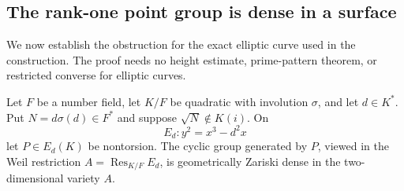 \subsection{The rank-one point group is dense in a surface}

We now establish the obstruction for the exact elliptic curve
used in the construction.  The proof needs no height estimate,
prime-pattern theorem, or restricted converse for elliptic curves.

\begin{lemma}\label{lem:conjugate-twist-density}
Let $F$ be a number field, let $K/F$ be quadratic with involution
$\sigma$, and let $d\in K^*$.  Put $N=d\sigma(d)\in F^*$ and
suppose $\sqrt N\notin K(i)$.  On
\[
                         E_d:y^2=x^3-d^2x
\]
let $P\in E_d(K)$ be nontorsion.  The cyclic group generated by
$P$, viewed in the Weil restriction
$A=\operatorname{Res}_{K/F}E_d$, is geometrically Zariski dense
in the two-dimensional variety $A$.
\end{lemma}
